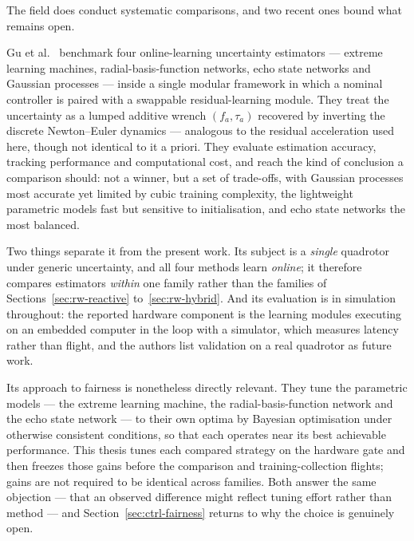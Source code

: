 The field does conduct systematic comparisons, and two recent ones bound what remains open.

Gu et al.~\cite{gu2025comparative} benchmark four online-learning uncertainty estimators ---
extreme learning machines, radial-basis-function networks, echo state networks and Gaussian
processes --- inside a single modular framework in which a nominal controller is paired with a
swappable residual-learning module. They treat the uncertainty as a lumped additive wrench
\((f_a, \tau_a)\) recovered by inverting the discrete Newton--Euler dynamics --- analogous to the
residual acceleration used here, though not identical to it a priori. They evaluate estimation accuracy, tracking
performance and computational cost, and reach the kind of conclusion a comparison should: not a
winner, but a set of trade-offs, with Gaussian processes most accurate yet limited by cubic
training complexity, the lightweight parametric models fast but sensitive to initialisation, and
echo state networks the most balanced.

Two things separate it from the present work. Its subject is a \emph{single} quadrotor under
generic uncertainty, and all four methods learn \emph{online}; it therefore compares estimators
\emph{within} one family rather than the families of Sections~\ref{sec:rw-reactive}
to~\ref{sec:rw-hybrid}. And its evaluation is in simulation throughout: the reported hardware
component is the learning modules executing on an embedded computer in the loop with a simulator,
which measures latency rather than flight, and the authors list validation on a real quadrotor as
future work.

Its approach to fairness is nonetheless directly relevant. They tune the parametric models --- the
extreme learning machine, the radial-basis-function network and the echo state network --- to their
own optima by Bayesian optimisation under otherwise consistent conditions, so that each operates
near its best achievable performance. This thesis tunes each compared strategy on the hardware gate
and then freezes those gains before the comparison and training-collection flights; gains are not
required to be identical across families. Both answer the same objection --- that an observed
difference might reflect tuning effort rather than method --- and Section~\ref{sec:ctrl-fairness}
returns to why the choice is genuinely open.

